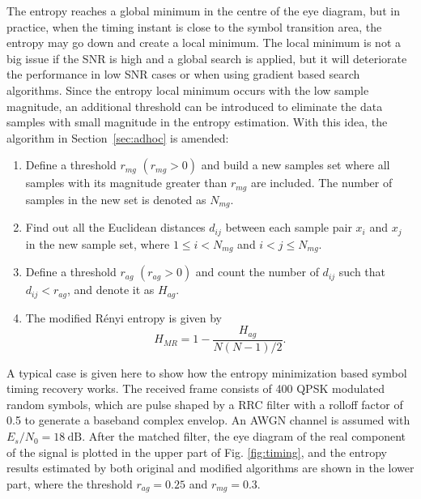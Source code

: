 \documentclass[journal,comsoc]{IEEEtran}
\begin{document}
The entropy reaches a global minimum in the centre of the eye diagram, but in practice, when the timing instant is close to the symbol transition area, the entropy may go down and create a local minimum. 
The local minimum is not a big issue if the SNR is high and a global search is applied, but it will deteriorate the performance in low SNR cases or when using gradient based search algorithms.
Since the entropy local minimum occurs with the low sample magnitude, an additional threshold can be introduced to eliminate the data samples with small magnitude in the entropy estimation.
With this idea, the algorithm in Section~\ref{sec:adhoc} is amended:

\begin{enumerate}
\item Define a threshold \(r_{mg}\) \((r_{mg}>0)\) and build a new samples set where all samples with its magnitude greater than \(r_{mg}\) are included.
The number of samples in the new set is denoted as \(N_{mg}\).
\item Find out all the Euclidean distances \(d_{ij}\) between each sample pair \(x_i\) and \(x_j\) in the new sample set, where \(1\le i<N_{mg}\) and \( i<j \le N_{mg}\). 
\item Define a threshold \(r_{ag}\) \((r_{ag}>0)\) and count the number of \(d_{ij}\) such that $d_{ij}<r_{ag}$, and denote it as $H_{ag}$.
\item The modified R\'enyi entropy is given by
\begin{equation}
H_{MR}= 1- \frac{ H_{ag}}{ N(N-1)/2}.
\label{eq:entorpy_ad2}
\end{equation}
\end{enumerate}



A typical case is given here to show how the entropy minimization based symbol timing recovery works.
The received frame consists of 400 QPSK modulated random symbols, 
which are pulse shaped by a RRC filter with a rolloff factor of 0.5 to generate a baseband complex envelop.
An AWGN channel is assumed with $E_s/N_0 = 18~\text{dB}$. 
After the matched filter, the eye diagram of the real component of the signal is plotted in the upper part of Fig. \ref{fig:timing}, and the entropy results estimated by both original and modified algorithms are shown in the lower part,
where the threshold $r_{ag}=0.25$ and \(r_{mg}=0.3\).
\end{document}
